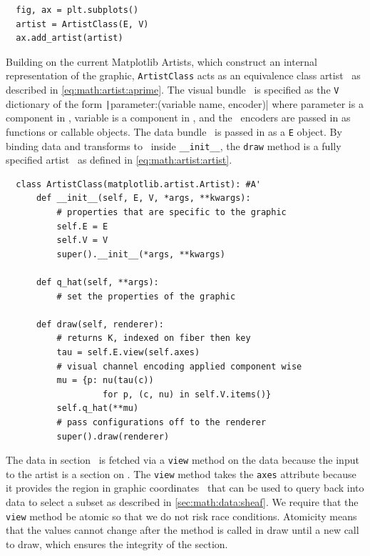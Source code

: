\documentclass[../main.tex]{subfiles}
\begin{document}
\begin{verbatim}
  fig, ax = plt.subplots()
  artist = ArtistClass(E, V)
  ax.add_artist(artist)
\end{verbatim}
Building on the current Matplotlib Artists, which construct an internal representation of the graphic, \texttt{ArtistClass} acts as an equivalence class artist \vartisteq\ as described in \autoref{eq:math:artist:aprime}. The visual bundle \vtotal\ is specified as the \texttt{V} dictionary of the form \texttt|{parameter:(variable name, encoder)}| where parameter is a component in \vfiber, variable is a component in \dfiber, and the \vchannel\ encoders are passed in as functions or callable objects. The data bundle \dtotal\ is passed in as a \texttt{E} object. By binding data and transforms to \vartisteq\ inside \texttt{__init__}, the \texttt{draw} method is a fully specified artist \vartist\ as defined in \autoref{eq:math:artist:artist}.
\begin{verbatim}
  class ArtistClass(matplotlib.artist.Artist): #A'
      def __init__(self, E, V, *args, **kwargs):
          # properties that are specific to the graphic
          self.E = E
          self.V = V 
          super().__init__(*args, **kwargs)
  
      def q_hat(self, **args): 
          # set the properties of the graphic
  
      def draw(self, renderer):
          # returns K, indexed on fiber then key 
          tau = self.E.view(self.axes) 
          # visual channel encoding applied component wise 
          mu = {p: nu(tau(c))
                   for p, (c, nu) in self.V.items()} 
          self.q_hat(**mu)
          # pass configurations off to the renderer
          super().draw(renderer)
  \end{verbatim}
 The data in section \dsection\ is fetched via a \texttt{view} method on the data because the input to the artist is a section on \dtotal. The \texttt{view} method takes the \texttt{axes} attribute because it provides the region in graphic coordinates \gbase\ that can be used to query back into data to select a subset as described in \autoref{sec:math:data:sheaf}. We require that the \texttt{view} method be atomic so that we do not risk race conditions. Atomicity means that the values cannot change after the method is called in draw until a new call to draw\cite{ullmanFirstCourseDatabase2008}, which ensures the integrity of the section.
 
\end{document}
